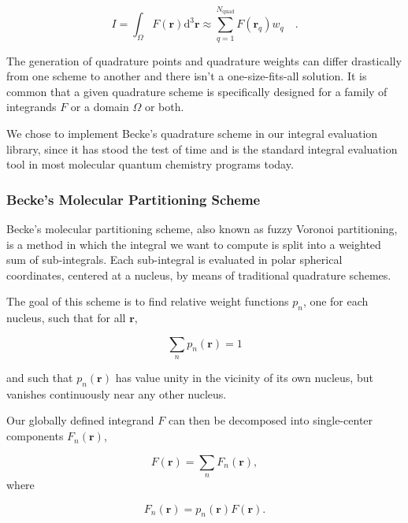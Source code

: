 \documentclass{article}
\begin{document}
\begin{equation}
  I = \int_\Omega F(\mathbf r) \mathrm d^3 \mathbf r \approx
  \sum_{q=1}^{N_{\text{quad}}}F(\mathbf r_q)w_q \quad.
  \label{eq:global_quadrature}
\end{equation}

The generation of quadrature points and quadrature weights can
differ drastically from one scheme to another and there isn't a
one-size-fits-all solution. It is common that a given quadrature
scheme is specifically designed for a family of integrands $F$ or a
domain $\Omega$ or both.

We chose to implement Becke's quadrature scheme in our integral
evaluation library, since it has stood the test of time and is the
standard integral evaluation tool in most molecular quantum chemistry
programs today.\cite{Becke_1988, Franchini2013}

\subsubsection{Becke's Molecular Partitioning Scheme}
Becke's molecular partitioning scheme,\cite{Becke_1988} also known as
fuzzy Voronoi partitioning, is a method in which the integral we want
to compute is split into a weighted sum of sub-integrals. Each
sub-integral is evaluated in polar spherical coordinates,
centered at a nucleus, by means of traditional quadrature schemes.

The goal of this scheme is to find relative weight functions $p_n$,
one for each nucleus, such that for all $\mathbf r$,

\begin{equation}
  \sum_n p_n(\mathbf r) = 1
  \label{eq:partition_weights_unity}
\end{equation}

and such that $p_n(\mathbf r)$ has value unity in the vicinity of its
own nucleus, but vanishes continuously near any other nucleus.

Our globally defined integrand $F$ can then be decomposed into
single-center components $F_n(\mathbf r)$,

\begin{equation}
  F(\mathbf r) = \sum_n F_n(\mathbf r),
  \label{eq:integrand_decomposed}
\end{equation}
where

\begin{equation}
  F_n(\mathbf r) = p_n(\mathbf r) F(\mathbf r).
  \label{eq:partial-integrand_definition}
\end{equation}
\end{document}
